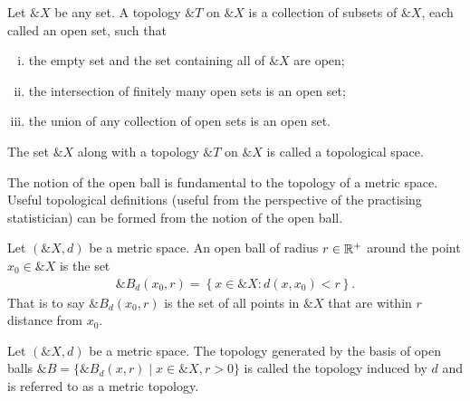 
\begin{definition}%
  \label{def:topology1}
  Let $\&X$ be any set. A \textnormal{\sffamily topology} $\&T$ on $\&X$ is a
  collection of subsets of $\&X$, each called an open set, such that
  \begin{enumerate}[(i)]
    \item the empty set and the set containing all of $\&X$ are open;
    \item the intersection of finitely many open sets is an open set;
    \item the union of any collection of open sets is an open set.
  \end{enumerate}
  The set $\&X$ along with a topology $\&T$ on $\&X$ is called a
  \textnormal{\sffamily topological space}.
\end{definition}

The notion of the open ball is fundamental to the topology of a metric space.
Useful topological definitions (useful from the perspective of the practising
statistician) can be formed from the notion of the open ball.

\begin{definition}%
  \label{def:open-ball}
  Let $(\&X, d)$ be a metric space. An \textnormal{\sffamily open ball} of
  radius $r \in \mathbb{R}^+$ around the point $x_0 \in \&X$ is the set
  \begin{align}
    \&B_d(x_0, r) = \left\{ x \in \&X : d(x, x_0) < r \right\}.
  \end{align}
  That is to say $\&B_d(x_0, r)$ is the set of all points in $\&X$ that are within
  $r$ distance from $x_0$.
\end{definition}

\begin{definition}%
  \label{def:topology2}
  Let $(\&X, d)$ be a metric space. The topology generated by the basis of open
  balls $\&B = \{\&B_d(x, r) \mid x \in \&X, r > 0\}$ is called the
  \textnormal{\sffamily topology induced by} $d$ and is referred to as a
  \textnormal{\sffamily metric topology}.
\end{definition}

